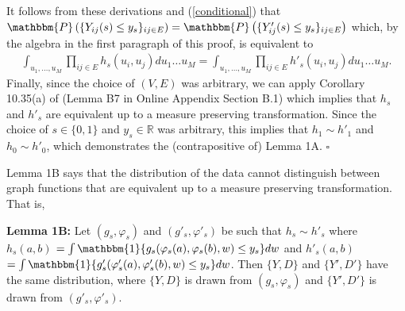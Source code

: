 \documentclass[12pt]{article}
\theoremstyle{definition}
\begin{document}
\begin{flushleft}
It follows from these derivations and (\ref{conditional}) that $\mathbbm{P}\left( \{Y_{ij}(s) \leq y_s\}_{ij \in E}\right) = \mathbbm{P}\left( \{Y'_{ij}(s) \leq y_s\}_{ij \in E}\right)$ which, by the algebra in the first paragraph of this proof, is equivalent to 
\begin{align}\label{equaldensity}
  \int_{u_1,\ldots,u_{M}}\prod_{ij \in E}h_{s}(u_i,u_j)du_1\ldots u_{M} =   \int_{u_1,\ldots,u_{M}}\prod_{ij \in E}h'_{s}(u_i,u_j)du_1\ldots u_{M}.
  \end{align}
Finally, since the choice of $(V,E)$ was arbitrary, we can apply Corollary 10.35(a) of \cite{lovasz2012large} (Lemma B7 in Online Appendix Section B.1) which implies that $h_{s}$ and $h'_{s}$ are equivalent up to a measure preserving transformation. Since the choice of $s \in \{0,1\}$ and $y_s \in \mathbb{R}$ was arbitrary, this implies that $h_{1} \sim h'_{1}$ and $h_{0} \sim h'_{0}$, which demonstrates the (contrapositive of) Lemma 1A.  $\square$
\end{flushleft}

Lemma 1B says that the distribution of the data cannot distinguish between graph functions that are equivalent up to a measure preserving transformation. That is,
\begin{flushleft}
\textbf{Lemma 1B:} Let $(g_{s},\varphi_{s})$ and $(g'_{s},\varphi'_{s})$ be such that $h_{s} \sim h'_{s}$ where  $h_{s}(a,b)$ $=  \int \mathbbm{1}\{g_{s}(\varphi_s(a),\varphi_s(b),w) \leq y_s\}dw$ and $h'_{s}(a,b)$ $=  \int \mathbbm{1}\{g'_{s}(\varphi'_s(a),\varphi'_s(b),w) \leq y_s\}dw$. Then $\{Y,D\}$ and $\{Y',D'\}$ have the same distribution, where $\{Y,D\}$ is drawn from $(g_{s},\varphi_{s})$ and $\{Y',D'\}$ is drawn from $(g'_{s},\varphi'_{s})$. \end{flushleft}
\end{document}
